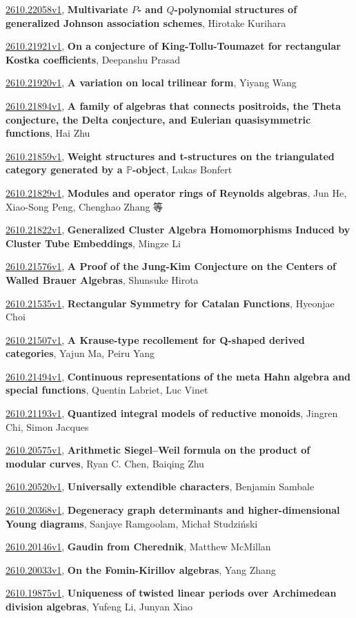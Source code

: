 \documentclass[9pt, a4paper]{article}
\theoremstyle{plain}
\theoremstyle{definition}
\theoremstyle{remark}
\newcommand{\arxiv}[3]{\href{https://arxiv.org/abs/#1}{#1}, \textbf{\textcolor{arxivblue}{#2}}, #3}
\begin{document}
\arxiv{2610.22058v1}{Multivariate $P$- and $Q$-polynomial structures of generalized Johnson association schemes}{Hirotake Kurihara}

\arxiv{2610.21921v1}{On a conjecture of King-Tollu-Toumazet for rectangular Kostka coefficients}{Deepanshu Prasad}

\arxiv{2610.21920v1}{A variation on local trilinear form}{Yiyang Wang}

\arxiv{2610.21894v1}{A family of algebras that connects positroids, the Theta conjecture, the Delta conjecture, and Eulerian quasisymmetric functions}{Hai Zhu}

\arxiv{2610.21859v1}{Weight structures and t-structures on the triangulated category generated by a $\mathbb{P}$-object}{Lukas Bonfert}

\arxiv{2610.21829v1}{Modules and operator rings of Reynolds algebras}{Jun He, Xiao-Song Peng, Chenghao Zhang 等}

\arxiv{2610.21822v1}{Generalized Cluster Algebra Homomorphisms Induced by Cluster Tube Embeddings}{Mingze Li}

\arxiv{2610.21576v1}{A Proof of the Jung-Kim Conjecture on the Centers of Walled Brauer Algebras}{Shunsuke Hirota}

\arxiv{2610.21535v1}{Rectangular Symmetry for Catalan Functions}{Hyeonjae Choi}

\arxiv{2610.21507v1}{A Krause-type recollement for Q-shaped derived categories}{Yajun Ma, Peiru Yang}

\arxiv{2610.21494v1}{Continuous representations of the meta Hahn algebra and special functions}{Quentin Labriet, Luc Vinet}

\arxiv{2610.21193v1}{Quantized integral models of reductive monoids}{Jingren Chi, Simon Jacques}

\arxiv{2610.20575v1}{Arithmetic Siegel--Weil formula on the product of modular curves}{Ryan C. Chen, Baiqing Zhu}

\arxiv{2610.20520v1}{Universally extendible characters}{Benjamin Sambale}

\arxiv{2610.20368v1}{Degeneracy graph determinants and higher-dimensional Young diagrams}{Sanjaye Ramgoolam, Michał Studziński}

\arxiv{2610.20146v1}{Gaudin from Cherednik}{Matthew McMillan}

\arxiv{2610.20033v1}{On the Fomin-Kirillov algebras}{Yang Zhang}

\arxiv{2610.19875v1}{Uniqueness of twisted linear periods over Archimedean division algebras}{Yufeng Li, Junyan Xiao}
\end{document}
